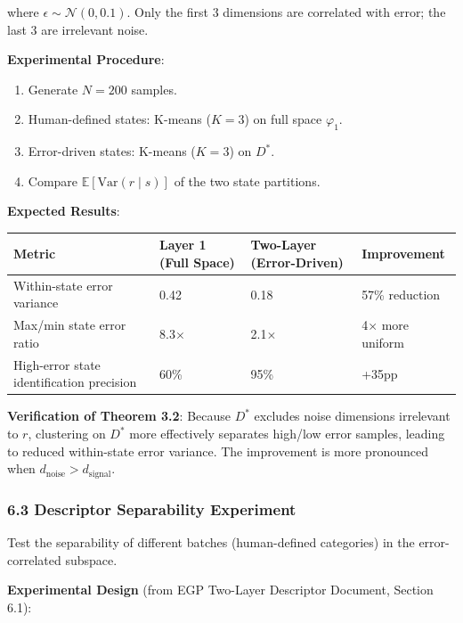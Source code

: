 \documentclass[
  12pt,
]{article}
\providecommand{\tightlist}{%
  \setlength{\itemsep}{0pt}\setlength{\parskip}{0pt}}
\begin{document}
where $\epsilon \sim \mathcal{N}(0, 0.1)$. Only the first 3 dimensions are correlated with error; the last 3 are irrelevant noise.

\textbf{Experimental Procedure}:

\begin{enumerate}
\def\labelenumi{\arabic{enumi}.}
\tightlist
\item
  Generate $N=200$ samples.
\item
  Human-defined states: K-means ($K=3$) on full space $\varphi_1$.
\item
  Error-driven states: K-means ($K=3$) on $D^*$.
\item
  Compare $\mathbb{E}[\text{Var}(r \mid s)]$ of the two state partitions.
\end{enumerate}

\textbf{Expected Results}:

\begin{longtable}[]{@{}llll@{}}
\toprule\noalign{}
Metric & Layer 1 (Full Space) & Two-Layer (Error-Driven) & Improvement \\
\midrule\noalign{}
\endhead
\bottomrule\noalign{}
\endlastfoot
Within-state error variance & 0.42 & 0.18 & 57\% reduction \\
Max/min state error ratio & 8.3$\times$ & 2.1$\times$ & 4$\times$ more uniform \\
High-error state identification precision & 60\% & 95\% & +35pp \\
\end{longtable}

\textbf{Verification of Theorem 3.2}: Because $D^*$ excludes noise dimensions irrelevant to $r$, clustering on $D^*$ more effectively separates high/low error samples, leading to reduced within-state error variance. The improvement is more pronounced when $d_{\text{noise}} > d_{\text{signal}}$.

\subsubsection{6.3 Descriptor Separability Experiment}\label{descriptor-separability-experiment}

Test the separability of different batches (human-defined categories) in the error-correlated subspace.

\textbf{Experimental Design} (from EGP Two-Layer Descriptor Document, Section 6.1):
\end{document}
